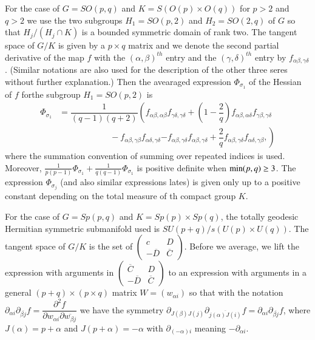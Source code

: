 For the case of $G=SO(p,q)$ and $K=S(O(p)\times O(q))$ for $p > 2$ and $q > 2$ we use the two subgroups $H_{1}=SO(p,2)$ and $H_{2}=SO(2,q)$ of $G$ so that $H_{j}/(H_{j}\cap K)$ is a bounded symmetric domain of rank two. The tangent space of $G/K$ is given by a $p \times q$ matrix and we denote the second partial derivative of the map $f$ with the $(\alpha, \beta)^{th}$ entry and the $(\gamma, \delta)^{th}$ entry by $f_{\alpha \beta, \gamma \delta}$. (Similar notations are also used for the description of the other three seres without further explanation.) Then the avearaged expression $\Phi_{\sigma_{1}}$ of the Hessian of $f$ for\pageoriginale the subgroup $H_{1}=SO(p,2)$ is
\begin{equation*}
\begin{split}
\Phi_{\sigma_{1}}&= \dfrac{1}{(q-1)(q+2)}\left( f_{\alpha \beta, \alpha \beta}f_{\gamma \delta,\gamma \delta}+ \left(1-\dfrac{2}{q}\right)f_{\alpha \beta, \alpha \delta}f_{\gamma \beta,\gamma \delta}\right.\\
&\qquad \qquad \qquad -f_{\alpha \beta, \gamma \beta}
f_{\alpha \delta, \gamma \delta} \left.-f_{\alpha \beta, \gamma \delta}f_{\alpha \beta, \gamma \delta} + \dfrac{2}{q}f_{\alpha \beta, \gamma \delta}f_{\alpha \delta, \gamma \beta},\right)
\end{split}
\end{equation*}
where the summation convention of summing over repeated indices is used. Moreover, $\frac{1}{p(p-1)}\Phi_{\sigma_{1}} + \frac{1}{q(q-1)}\Phi_{\sigma_{1}}$ is positive definite when $\min(p,q)\break \geq 3$. The expression $\Phi_{\sigma_{j}}$ (and also similar expressions lates) is given only up to a positive constant depending on the total measure of th compact group $K$.

For the case of $G=Sp(p,q)$ and $K=Sp(p)\times Sp(q)$, the  totally geodesic Hermitian symmetric submanifold used is
$SU(p + q)/s(U(p) \times U(q))$. The tangent space of $G/K$ is the set of
$\begin{pmatrix}
c & D\\
-\overline{D} & \overline{C}
\end{pmatrix}$. Before we average, we lift the expression with arguments in $\begin{pmatrix}
\overline{C} & D\\
-\overline{D} & \overline{C}
\end{pmatrix}$ to an expression with arguments in a general $(p + q)\times (p \times q)$ matrix $W=(w_{\alpha i})$ so that with the notation $\partial_{\alpha i} \partial_{\overline{\beta j}}f=\dfrac{\partial^{2}f}{\partial w_{\alpha i}\partial\overline{w_{\beta j}}}$ we have the symmetry $\partial_{J(\beta)J(j)}\partial_{\overline{j(\alpha)J(i)}}f=\partial_{\alpha i}\partial_{\overline{\beta j}}f$, where $J(\alpha) = p+ \alpha$ and $J(p +\alpha) = -\alpha$ with $\partial_{(-\alpha)i}$ meaning $-\partial_{\alpha i}$.

